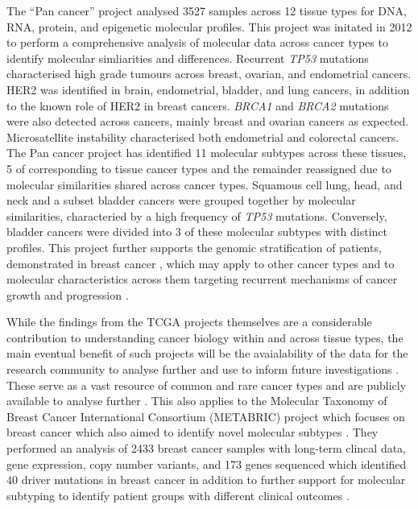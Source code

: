 The ``Pan cancer'' project \citep{TCGA2013PAN,TCGA2014PAN} analysed 3527 samples across 12 tissue types for DNA, RNA, protein, and epigenetic molecular profiles. This project was initated in 2012 to perform a comprehensive analysis of molecular data across cancer types to identify molecular simliarities and differences. Recurrent \textit{TP53} mutations characterised high grade tumours across breast, ovarian, and endometrial cancers. HER2 was identified in brain, endometrial, bladder, and lung cancers, in addition to the known role of HER2 in breast cancers. \textit{BRCA1} and \textit{BRCA2} mutations were also detected across cancers, mainly breast and ovarian cancers as expected. Microsatellite instability characterised both endometrial and colorectal cancers.  The Pan cancer project \citep{TCGA2014PAN} has identified 11 molecular subtypes across these tissues,  5 of corresponding to tissue cancer types and the remainder reassigned due to molecular similarities shared across cancer types. Squamous cell lung, head, and neck and a subset bladder cancers were grouped together by molecular similarities, characteried by a high frequency of \textit{TP53} mutations. Conversely, bladder cancers were divided into 3 of these molecular subtypes with distinct profiles. This project further supports the genomic stratification of patients, demonstrated in breast cancer \citep{Perou2000, Parker2009, METABRIC2016}, which may apply to other cancer types and to molecular characteristics across them targeting recurrent mechanisms of cancer growth and progression \citep{Hanahan2000, Hanahan2011}.

While the findings from the TCGA projects themselves are a considerable contribution to understanding cancer biology within and across tissue types, the main eventual benefit of such projects will be the avaialability of the data for the research community to analyse further and use to inform future investigations \citep{TCGA2008GBM, TCGA2013PAN, TCGA2017web}. These serve as a vast resource of common and rare cancer types and are publicly available to analyse further \citep{cBioPortal, TCGA2017web, ICGC2011}. This also applies to the Molecular Taxonomy of Breast Cancer International Consortium (METABRIC) project which focuses on breast cancer which also aimed to identify novel molecular subtypes \citep{METABRIC2012}. They performed an analysis of 2433 breast cancer samples with long-term clincal data,  gene expression, copy number variants, and 173 genes sequenced which identified 40 driver mutations in breast cancer in addition to further support for molecular subtyping to identify patient groups with different clinical outcomes \citep{METABRIC2016}.


